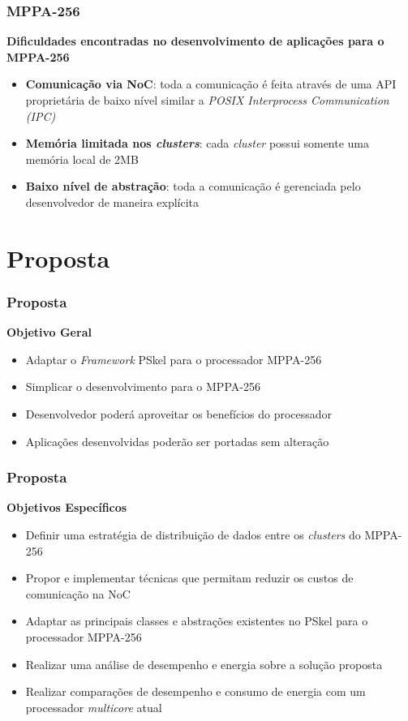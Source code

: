 \documentclass[xcolor={table}]{beamer}
\newcommand{\Fw}{\textit{Framework}\xspace}
\begin{document}
\begin{frame}\frametitle{MPPA-256}
    \textbf{Dificuldades encontradas no desenvolvimento de aplicações para o MPPA-256}

    \begin{itemize}
        \item \textbf{Comunicação via NoC}: toda a comunicação é feita através de uma API proprietária de baixo nível similar a \textit{POSIX Interprocess Communication (IPC)}
        \item \textbf{Memória limitada nos \textit{clusters}}: cada \textit{cluster} possui somente uma memória local de 2MB
        \item \textbf{Baixo nível de abstração}: toda a comunicação é gerenciada pelo desenvolvedor de maneira explícita
    \end{itemize}
\end{frame}


\section{Proposta}
\begin{frame}\frametitle{Proposta}
    \textbf{Objetivo Geral}
    \begin{itemize}
        \item {Adaptar o \Fw PSkel para o processador MPPA-256}
                \item {Simplicar o desenvolvimento para o MPPA-256}
                \item {Desenvolvedor poderá aproveitar os benefícios do processador}
                \item {Aplicações desenvolvidas poderão ser portadas sem alteração}
    \end{itemize}
\end{frame}


\begin{frame}\frametitle{Proposta}
    \textbf{Objetivos Específicos}
    \begin{itemize}
        \item {Definir uma estratégia de distribuição de dados entre os \textit{clusters} do MPPA-256}
        \item {Propor e implementar técnicas que permitam reduzir os custos de comunicação na NoC}
        \item {Adaptar as principais classes e abstrações existentes no PSkel para o processador MPPA-256}
        \item {Realizar uma análise de desempenho e energia sobre a solução proposta}
        \item {Realizar comparações de desempenho e consumo de energia com um processador \textit{multicore} atual}
    \end{itemize}
\end{frame}
\end{document}
